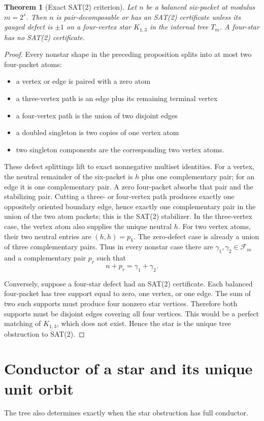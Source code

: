 \documentclass[11pt,oneside]{book}
\newtheorem{theorem}{Theorem}[chapter]
\theoremstyle{definition}
\theoremstyle{remark}
\begin{document}
\begin{theorem}[Exact SAT(2) criterion]
Let \(n\) be a balanced six-packet at modulus \(m=2^s\). Then \(n\) is pair-decomposable or has an SAT(2) certificate unless its gauged defect is \(\pm1\) on a four-vertex star \(K_{1,3}\) in the internal tree \(T_m\). A four-star has no SAT(2) certificate.
\end{theorem}
\begin{proof}
Every nonstar shape in the preceding proposition splits into at most two four-packet atoms:
\begin{itemize}
\item a vertex or edge is paired with a zero atom
\item a three-vertex path is an edge plus its remaining terminal vertex
\item a four-vertex path is the union of two disjoint edges
\item a doubled singleton is two copies of one vertex atom
\item two singleton components are the corresponding two vertex atoms.
\end{itemize}
These defect splittings lift to exact nonnegative multiset identities. For a vertex, the neutral remainder of the six-packet is \(h\) plus one complementary pair; for an edge it is one complementary pair. A zero four-packet absorbs that pair and the stabilizing pair. Cutting a three- or four-vertex path produces exactly one oppositely oriented boundary edge, hence exactly one complementary pair in the union of the two atom packets; this is the SAT(2) stabilizer. In the three-vertex case, the vertex atom also supplies the unique neutral \(h\). For two vertex atoms, their two neutral entries are \((h,h)=p_h\). The zero-defect case is already a union of three complementary pairs. Thus in every nonstar case there are \(\gamma_1,\gamma_2\in\mathcal F_m\) and a complementary pair \(p_r\) such that
\[
n+p_r=\gamma_1+\gamma_2.
\]

Conversely, suppose a four-star defect had an SAT(2) certificate. Each balanced four-packet has tree support equal to zero, one vertex, or one edge. The sum of two such supports must produce four nonzero star vertices. Therefore both supports must be disjoint edges covering all four vertices. This would be a perfect matching of \(K_{1,3}\), which does not exist. Hence the star is the unique tree obstruction to SAT(2).
\end{proof}

\section{Conductor of a star and its unique unit orbit}
The tree also determines exactly when the star obstruction has full conductor.
\end{document}

